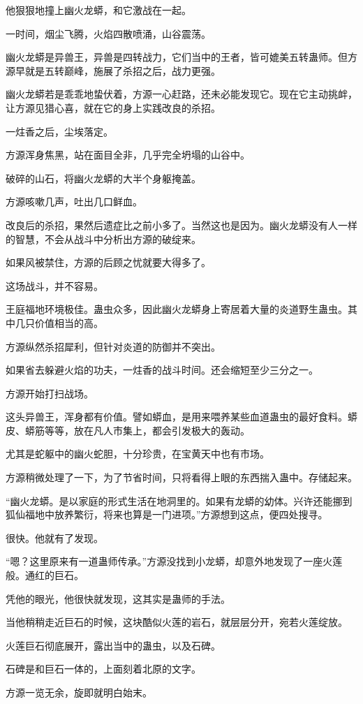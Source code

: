 \begin{this_body}
他狠狠地撞上幽火龙蟒，和它激战在一起。

一时间，烟尘飞腾，火焰四散喷涌，山谷震荡。

幽火龙蟒是异兽王，异兽是四转战力，它们当中的王者，皆可媲美五转蛊师。但方源早就是五转巅峰，施展了杀招之后，战力更强。

幽火龙蟒若是乖乖地蛰伏着，方源一心赶路，还未必能发现它。现在它主动挑衅，让方源见猎心喜，就在它的身上实践改良的杀招。

一炷香之后，尘埃落定。

方源浑身焦黑，站在面目全非，几乎完全坍塌的山谷中。

破碎的山石，将幽火龙蟒的大半个身躯掩盖。

方源咳嗽几声，吐出几口鲜血。

改良后的杀招，果然后遗症比之前小多了。当然这也是因为。幽火龙蟒没有人一样的智慧，不会从战斗中分析出方源的破绽来。

如果风被禁住，方源的后顾之忧就要大得多了。

这场战斗，并不容易。

王庭福地环境极佳。蛊虫众多，因此幽火龙蟒身上寄居着大量的炎道野生蛊虫。其中几只价值相当的高。

方源纵然杀招犀利，但针对炎道的防御并不突出。

如果省去躲避火焰的功夫，一炷香的战斗时间。还会缩短至少三分之一。

方源开始打扫战场。

这头异兽王，浑身都有价值。譬如蟒血，是用来喂养某些血道蛊虫的最好食料。蟒皮、蟒筋等等，放在凡人市集上，都会引发极大的轰动。

尤其是蛇躯中的幽火蛇胆，十分珍贵，在宝黄天中也有市场。

方源稍微处理了一下，为了节省时间，只将看得上眼的东西揣入蛊中。存储起来。

“幽火龙蟒。是以家庭的形式生活在地洞里的。如果有龙蟒的幼体。兴许还能挪到狐仙福地中放养繁衍，将来也算是一门进项。”方源想到这点，便四处搜寻。

很快。他就有了发现。

“嗯？这里原来有一道蛊师传承。”方源没找到小龙蟒，却意外地发现了一座火莲般。通红的巨石。

凭他的眼光，他很快就发现，这其实是蛊师的手法。

当他稍稍走近巨石的时候，这块酷似火莲的岩石，就层层分开，宛若火莲绽放。

火莲巨石彻底展开，露出当中的蛊虫，以及石碑。

石碑是和巨石一体的，上面刻着北原的文字。

方源一览无余，旋即就明白始末。


\end{this_body}
